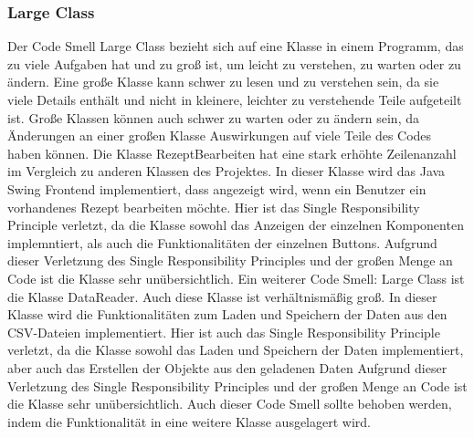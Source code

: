 \subsubsection{Large Class}
Der Code Smell Large Class bezieht sich auf eine Klasse in einem Programm, das zu viele Aufgaben hat und zu groß ist, um leicht zu verstehen, zu warten oder zu ändern. Eine große Klasse kann schwer zu lesen und zu verstehen sein, da sie viele Details enthält und nicht in kleinere, leichter zu verstehende Teile aufgeteilt ist. Große Klassen können auch schwer zu warten oder zu ändern sein, da Änderungen an einer großen Klasse Auswirkungen auf viele Teile des Codes haben können. Die Klasse RezeptBearbeiten hat eine stark erhöhte Zeilenanzahl im Vergleich zu anderen Klassen des Projektes. In dieser Klasse wird das Java Swing Frontend implementiert, dass angezeigt wird, wenn ein Benutzer ein vorhandenes Rezept bearbeiten möchte. Hier ist das
Single Responsibility Principle verletzt, da die Klasse sowohl das Anzeigen der einzelnen Komponenten implemntiert, als auch die Funktionalitäten der einzelnen Buttons. Aufgrund dieser Verletzung des Single Responsibility Principles und der großen Menge an Code ist die Klasse sehr unübersichtlich. Ein weiterer Code Smell: Large Class ist die Klasse DataReader. Auch diese Klasse ist verhältnismäßig groß. In dieser Klasse wird die Funktionalitäten zum Laden und Speichern der Daten aus den CSV-Dateien implementiert. Hier ist auch das Single Responsibility Principle verletzt, da die Klasse sowohl das Laden und Speichern der Daten implementiert, aber auch das Erstellen der Objekte aus den geladenen Daten Aufgrund dieser Verletzung des Single Responsibility Principles und der großen Menge an Code ist die Klasse sehr unübersichtlich. Auch dieser Code Smell sollte behoben werden, indem die Funktionalität in eine weitere Klasse ausgelagert wird.
